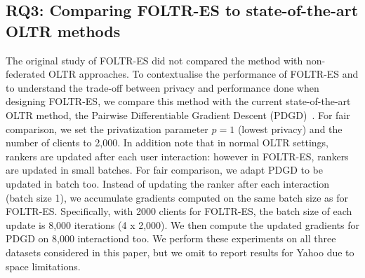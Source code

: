 

\subsection{RQ3: Comparing FOLTR-ES to state-of-the-art OLTR methods}
The original study of FOLTR-ES did not compared the method with non-federated OLTR approaches. To contextualise the performance of FOLTR-ES and to understand the trade-off between privacy and performance done when designing FOLTR-ES, we compare this method with the current state-of-the-art OLTR method, the Pairwise Differentiable Gradient Descent (PDGD)~\cite{oosterhuis2018differentiable}. For fair comparison, we set the privatization parameter $p=1$ (lowest privacy) and the number of clients to 2,000. In addition note that in normal OLTR settings, rankers are updated after each user interaction: however in FOLTR-ES, rankers are updated in small batches. For fair comparison, we adapt PDGD to be updated in batch too. Instead of updating the ranker after each interaction (batch size 1), we accumulate gradients computed on the same batch size as for FOLTR-ES. Specifically, with 2000 clients for FOLTR-ES, the batch size of each update is 8,000 iterations (4 x 2,000). We then compute the updated gradients for PDGD on 8,000 interactiond too. %
We perform these experiments on all three datasets considered in this paper, but we omit to report results for Yahoo due to space limitations. 

